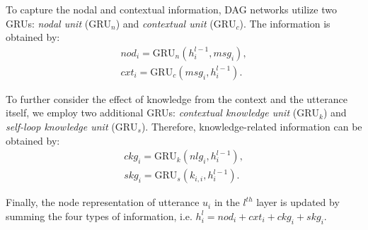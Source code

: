 \documentclass{article}
\begin{document}
\begin{table}[]
\centering
{}
\caption{Statistics of RECCON-DD. ``Positive'' means the true causal pair. }
\vspace{-0.2cm}
\label{dataset}
\end{table}

To capture the nodal and contextual information, DAG networks utilize two GRUs: \textit{nodal unit} ($\mathrm{GRU}_{n}$) and \textit{contextual unit} ($\mathrm{GRU}_{c}$). The information is obtained by:
\begin{eqnarray}
    nod_{i}=\mathrm{GRU}_{n}(h_{i}^{l-1}, msg_{i}), \\
    cxt_{i}=\mathrm{GRU}_{c}(msg_{i}, h_{i}^{l-1}). 
\end{eqnarray}

To further consider the effect of knowledge from the context and the utterance itself, we employ two additional GRUs: \textit{contextual knowledge unit} ($\mathrm{GRU}_{k}$) and \textit{self-loop knowledge unit} ($\mathrm{GRU}_{s}$). Therefore, knowledge-related information can be obtained by:
\begin{eqnarray}
    ckg_{i}=\mathrm{GRU}_{k}(nlg_i,  h_{i}^{l-1}), \\
    skg_{i}=\mathrm{GRU}_{s}(k_{i,i},  h_{i}^{l-1}). 
\end{eqnarray}

Finally, the node representation of utterance $u_i$ in the $l^{th}$ layer is updated by summing the four types of information, i.e. $h_{i}^{l}=nod_i + cxt_i + ckg_i + skg_i$. 
\end{document}
